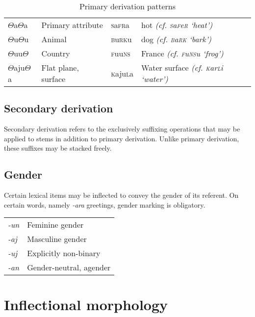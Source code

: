 \documentclass[a4paper,10pt,twoside,openright]{memoir}
\newcommand{\rootpart}{$\Theta$}
\newcommand{\famword}[5]{#1\textsc{#2}#3\textsc{#4}#5}
\begin{document}
\begin{table}[ht]
\begin{tabular}{llll}
    {\rootpart}a{\rootpart}a & Primary attribute & \famword{}{s}{a}{fr}{a} & hot \emph{(cf. \textsc{s}a\textsc{f}e\textsc{r} `heat')} \\
    {\rootpart}u{\rootpart}u & Animal & \famword{}{b}{u}{rk}{u} & dog \emph{(cf. \textsc{b}a\textsc{rk} `bark')} \\
    {\rootpart}uu{\rootpart} & Country & \famword{}{f}{uu}{ns}{} & France \emph{(cf. \textsc{f}u\textsc{ns}u `frog')} \\
    {\rootpart}aju{\rootpart}a & Flat plane, surface & \famword{}{k}{aju}{l}{a} & Water surface \emph{(cf. \textsc{k}ar\textsc{l}i `water')}
    \end{tabular}
    \caption{Primary derivation patterns}
    \label{tab:primedevs}
\end{table}

\subsection{Secondary derivation}

Secondary derivation refers to the exclusively suffixing operations that may be applied to stems in addition to primary derivation. Unlike primary derivation, these suffixes may be stacked freely. 

\subsection{Gender}

Certain lexical items may be inflected to convey the gender of its referent. On certain words, namely \emph{-ara} greetings, gender marking is obligatory.

\begin{table}[ht]
    \centering
    \begin{tabular}{>{\em}ll}
    -un & Feminine gender \\
    -aj & Masculine gender \\
    -uj & Explicitly non-binary \\
    -an & Gender-neutral, agender \\
    \end{tabular}
\end{table}



\section{Inflectional morphology}
\end{document}
